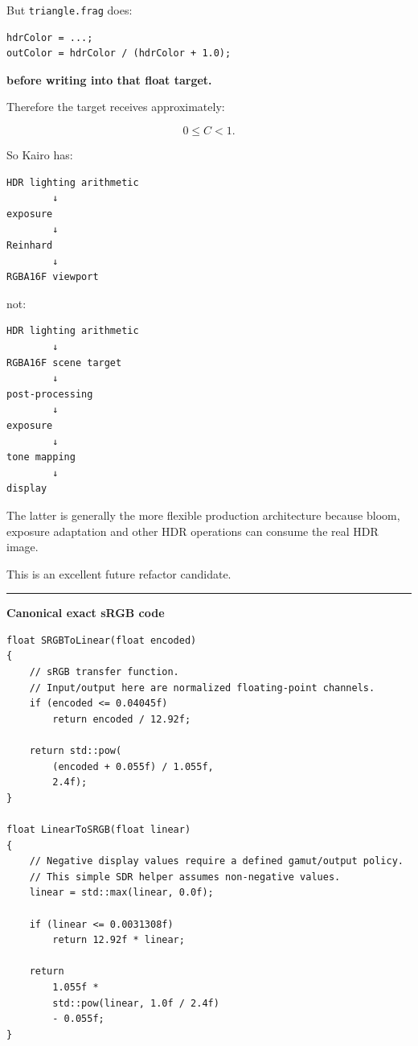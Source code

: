 But \texttt{triangle.frag} does:

\begin{verbatim}
hdrColor = ...;
outColor = hdrColor / (hdrColor + 1.0);
\end{verbatim}

\textbf{before writing into that float target.}

Therefore the target receives approximately:

\[
0\le C<1.
\]

So Kairo has:

\begin{verbatim}
HDR lighting arithmetic
        ↓
exposure
        ↓
Reinhard
        ↓
RGBA16F viewport
\end{verbatim}

not:

\begin{verbatim}
HDR lighting arithmetic
        ↓
RGBA16F scene target
        ↓
post-processing
        ↓
exposure
        ↓
tone mapping
        ↓
display
\end{verbatim}

The latter is generally the more flexible production architecture because bloom, exposure adaptation and other HDR operations can consume the real HDR image.

This is an excellent future refactor candidate.

\begin{center}\rule{0.5\linewidth}{0.5pt}\end{center}

\textbf{Canonical exact sRGB code}

\begin{verbatim}
float SRGBToLinear(float encoded)
{
    // sRGB transfer function.
    // Input/output here are normalized floating-point channels.
    if (encoded <= 0.04045f)
        return encoded / 12.92f;

    return std::pow(
        (encoded + 0.055f) / 1.055f,
        2.4f);
}

float LinearToSRGB(float linear)
{
    // Negative display values require a defined gamut/output policy.
    // This simple SDR helper assumes non-negative values.
    linear = std::max(linear, 0.0f);

    if (linear <= 0.0031308f)
        return 12.92f * linear;

    return
        1.055f *
        std::pow(linear, 1.0f / 2.4f)
        - 0.055f;
}
\end{verbatim}

